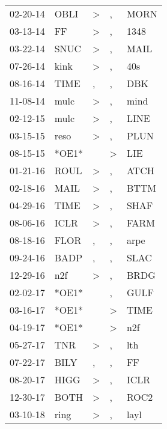 \begin{supertabular}{lllll}
 02-20-14 &   OBLI &     \textgreater &                , &   MORN \\
 03-13-14 &     FF &     \textgreater &                , &   1348 \\
 03-22-14 &   SNUC &     \textgreater &                , &   MAIL \\
 07-26-14 &   kink &     \textgreater &                , &    40s \\
 08-16-14 &   TIME &                , &                , &    DBK \\
 11-08-14 &   mulc &     \textgreater &                , &   mind \\
 02-12-15 &   mulc &     \textgreater &                , &   LINE \\
 03-15-15 &   reso &     \textgreater &                , &   PLUN \\
 08-15-15 &  *OE1* &                  &     \textgreater &    LIE \\
 01-21-16 &   ROUL &     \textgreater &                , &   ATCH \\
 02-18-16 &   MAIL &     \textgreater &                , &   BTTM \\
 04-29-16 &   TIME &     \textgreater &                , &   SHAF \\
 08-06-16 &   ICLR &     \textgreater &                , &   FARM \\
 08-18-16 &   FLOR &                , &                , &   arpe \\
 09-24-16 &   BADP &                , &                , &   SLAC \\
 12-29-16 &    n2f &     \textgreater &                , &   BRDG \\
 02-02-17 &  *OE1* &                  &                , &   GULF \\
 03-16-17 &  *OE1* &                  &     \textgreater &   TIME \\
 04-19-17 &  *OE1* &                  &     \textgreater &    n2f \\
 05-27-17 &    TNR &     \textgreater &                , &    lth \\
 07-22-17 &   BILY &                , &                , &     FF \\
 08-20-17 &   HIGG &     \textgreater &                , &   ICLR \\
 12-30-17 &   BOTH &     \textgreater &                , &   ROC2 \\
 03-10-18 &   ring &     \textgreater &                , &   layl \\

\end{supertabular}
